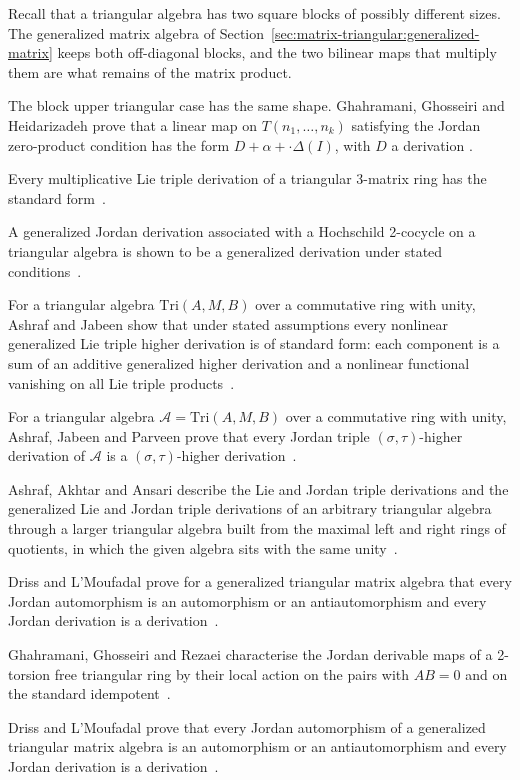 Recall that a triangular algebra has two square blocks of possibly different sizes. The
generalized matrix algebra of
Section~\ref{sec:matrix-triangular:generalized-matrix} keeps both off-diagonal
blocks, and the two bilinear maps that multiply them are what remains of the matrix
product.

The block upper triangular case has the same shape. Ghahramani, Ghosseiri and
Heidarizadeh prove that a linear map on $T(n_1,\dots,n_k)$ satisfying the Jordan
zero-product condition has the form $D+\alpha+\cdot\Delta(I)$, with $D$ a
derivation \cite[Abstract]{GhahramaniGhosseiriHeidarizadeh2020}.

Every multiplicative Lie triple derivation of a triangular 3-matrix ring has the standard form~\cite{WlMultiplicativeLieTriple2021}.

A generalized Jordan derivation associated with a Hochschild 2-cocycle on a triangular algebra is shown to be a generalized derivation under stated conditions~\cite{WlGeneralizedJordanDerivationsAs2019}.

For a triangular algebra $\mathrm{Tri}(A,M,B)$ over a commutative ring with unity, Ashraf and Jabeen show that under stated assumptions every nonlinear generalized Lie triple higher derivation is of standard form: each component is a sum of an additive generalized higher derivation and a nonlinear functional vanishing on all Lie triple products~\cite{WlNonlinearLieTripleHigherDeriva2018}.

For a triangular algebra $\mathcal{A}=\mathrm{Tri}(A,M,B)$ over a commutative ring with unity, Ashraf, Jabeen and Parveen prove that every Jordan triple $(\sigma,\tau)$-higher derivation of $\mathcal{A}$ is a $(\sigma,\tau)$-higher derivation~\cite{WlOnJordanTripleHigherDerivation2018}.

Ashraf, Akhtar and Ansari describe the Lie and Jordan triple derivations and the generalized Lie and Jordan triple derivations of an arbitrary triangular algebra through a larger triangular algebra built from the maximal left and right rings of quotients, in which the given algebra sits with the same unity~\cite{WlGeneralizedLieJordanTripleDeri2021}.

Driss and L'Moufadal prove for a generalized triangular matrix algebra that every Jordan automorphism is an automorphism or an antiautomorphism and every Jordan derivation is a derivation~\cite{WlJordanAutomorphismsJordanDeriv2005}.

Ghahramani, Ghosseiri and Rezaei characterise the Jordan derivable maps of a 2-torsion free triangular ring by their local action on the pairs with $AB=0$ and on the standard idempotent~\cite{WlCharacterizingJordanDerivableM2022}.

Driss and L'Moufadal prove that every Jordan automorphism of a generalized triangular matrix algebra is an automorphism or an antiautomorphism and every Jordan derivation is a derivation~\cite{WlJordanAutomorphismsJordanDeriv2020}.

